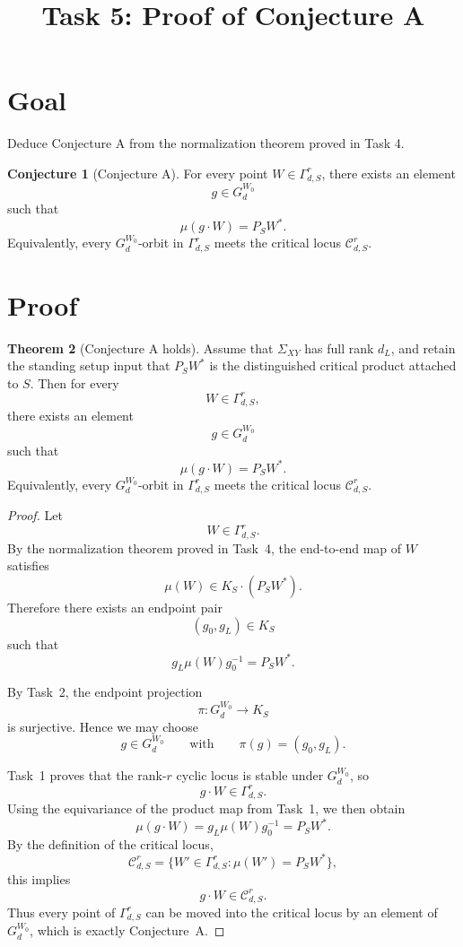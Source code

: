 \documentclass{article}
\title{Task 5: Proof of Conjecture A}
\date{}
\theoremstyle{definition}
\newtheorem{theorem}{Theorem}[section]
\newtheorem{conjecture}[theorem]{Conjecture}
\begin{document}
\maketitle

\section{Goal}

Deduce Conjecture A from the normalization theorem proved in Task 4.

\begin{conjecture}[Conjecture A]
For every point $W\in \Gamma_{d,S}^r$, there exists an element
\[
g\in G_d^{W_0}
\]
such that
\[
\mu(g\cdot W)=P_SW^\ast.
\]
Equivalently, every $G_d^{W_0}$-orbit in $\Gamma_{d,S}^r$ meets the critical locus $\mathcal C_{d,S}^r$.
\end{conjecture}

\section{Proof}

\begin{theorem}[Conjecture A holds]\label{thm:conjecture-A}
Assume that $\Sigma_{XY}$ has full rank $d_L$, and retain the standing setup
input that $P_SW^\ast$ is the distinguished critical product attached to $S$.
Then for every
\[
W\in \Gamma_{d,S}^r,
\]
there exists an element
\[
g\in G_d^{W_0}
\]
such that
\[
\mu(g\cdot W)=P_SW^\ast.
\]
Equivalently, every $G_d^{W_0}$-orbit in $\Gamma_{d,S}^r$ meets the critical
locus $\mathcal C_{d,S}^r$.
\end{theorem}

\begin{proof}
Let
\[
W\in \Gamma_{d,S}^r.
\]
By the normalization theorem proved in Task~4, the end-to-end map of $W$
satisfies
\[
\mu(W)\in K_S\cdot (P_SW^\ast).
\]
Therefore there exists an endpoint pair
\[
(g_0,g_L)\in K_S
\]
such that
\[
g_L\mu(W)g_0^{-1}=P_SW^\ast.
\]

By Task~2, the endpoint projection
\[
\pi:G_d^{W_0}\to K_S
\]
is surjective. Hence we may choose
\[
g\in G_d^{W_0}
\qquad\text{with}\qquad
\pi(g)=(g_0,g_L).
\]

Task~1 proves that the rank-$r$ cyclic locus is stable under $G_d^{W_0}$, so
\[
g\cdot W\in \Gamma_{d,S}^r.
\]
Using the equivariance of the product map from Task~1, we then obtain
\[
\mu(g\cdot W)=g_L\mu(W)g_0^{-1}=P_SW^\ast.
\]
By the definition of the critical locus,
\[
\mathcal C_{d,S}^r
=
\{W'\in \Gamma_{d,S}^r:\mu(W')=P_SW^\ast\},
\]
this implies
\[
g\cdot W\in \mathcal C_{d,S}^r.
\]
Thus every point of $\Gamma_{d,S}^r$ can be moved into the critical locus by an
element of $G_d^{W_0}$, which is exactly Conjecture~A.
\end{proof}
\end{document}
